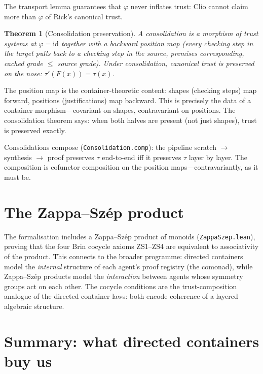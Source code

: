 \documentclass[11pt,a4paper]{article}
\theoremstyle{definition}
\theoremstyle{plain}
\newtheorem{theorem}[definition]{Theorem}
\theoremstyle{remark}
\begin{document}
The transport lemma guarantees that $\varphi$ never inflates trust:
Clio cannot claim more than $\varphi$ of Rick's canonical trust.

\begin{theorem}[Consolidation preservation]
A \emph{consolidation} is a morphism of trust systems at $\varphi =
\mathrm{id}$ together with a backward position map (every checking
step in the target pulls back to a checking step in the source,
premises corresponding, cached grade $\le$ source grade). Under
consolidation, canonical trust is preserved on the nose:
$\tau'(F(x)) = \tau(x)$.
\end{theorem}

The position map is the container-theoretic content: shapes (checking
steps) map forward, positions (justifications) map backward. This is
precisely the data of a container morphism---covariant on shapes,
contravariant on positions. The consolidation theorem says: when both
halves are present (not just shapes), trust is preserved exactly.

Consolidations compose (\texttt{Consolidation.comp}): the pipeline
scratch $\to$ synthesis $\to$ proof preserves $\tau$ end-to-end iff it
preserves $\tau$ layer by layer. The composition is cofunctor
composition on the position maps---contravariantly, as it must be.

\section{The Zappa--Sz\'ep product}

The formalisation includes a Zappa--Sz\'ep product of monoids
(\texttt{ZappaSzep.lean}), proving that the four Brin cocycle axioms
ZS1--ZS4 are equivalent to associativity of the product. This connects
to the broader programme: directed containers model the \emph{internal}
structure of each agent's proof registry (the comonad), while
Zappa--Sz\'ep products model the \emph{interaction} between agents
whose symmetry groups act on each other. The cocycle conditions are the
trust-composition analogue of the directed container laws: both encode
coherence of a layered algebraic structure.

\section{Summary: what directed containers buy us}
\end{document}
